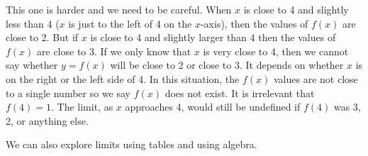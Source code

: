 \begin{example}
\begin{enumerate}[label=(\alph*)]
  \begin{solution}
This one is harder and we need to be careful. When $x$ is close to 4 and slightly less than 4 ($x$ is just to the left of 4 on the $x$-axis), then the values of $f(x)$ are close to 2. But if $x$ is close to 4 and slightly larger than 4 then the values of $f(x)$ are close to 3. If we only know that $x$ is very close to 4, then we cannot say whether $y=f(x)$ will be close to 2 or close to 3. It depends on whether $x$ is on the right or the left side of 4. In this situation, the $f(x)$ values are not close to a single number so we say $f(x)$ does not exist. It is irrelevant that $f(4)=1$. The limit, as $x$ approaches 4, would still be undefined if $f(4)$ was 3, 2, or anything else.
    \end{solution}
\end{enumerate}
\end{example}

We can also explore limits using tables and using algebra.


